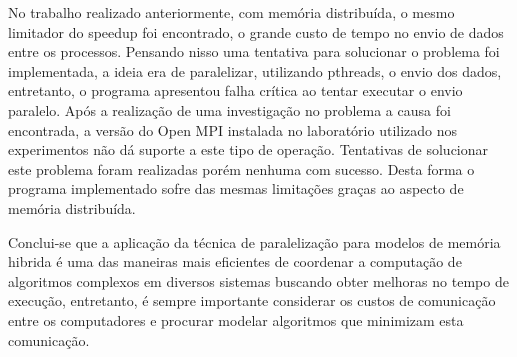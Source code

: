 \documentclass[12pt]{article}
\begin{document}
No trabalho realizado anteriormente, com memória distribuída, o mesmo limitador do speedup foi encontrado, o grande custo de tempo no envio de dados entre os processos. Pensando nisso uma tentativa para solucionar o problema foi implementada, a ideia era de paralelizar, utilizando pthreads, o envio dos dados, entretanto, o programa apresentou falha crítica ao tentar executar o envio paralelo. Após a realização de uma investigação no problema a causa foi encontrada, a versão do Open MPI instalada no laboratório utilizado nos experimentos não dá suporte a este tipo de operação. Tentativas de solucionar este problema foram realizadas porém nenhuma com sucesso. Desta forma o programa implementado sofre das mesmas limitações graças ao aspecto de memória distribuída.

Conclui-se que a aplicação da técnica de paralelização para modelos de memória hibrida é uma das maneiras mais eficientes de coordenar a computação de algoritmos complexos em diversos sistemas buscando obter melhoras no tempo de execução, entretanto, é sempre importante considerar os custos de comunicação entre os computadores e procurar modelar algoritmos que minimizam esta comunicação. 



\end{document}
